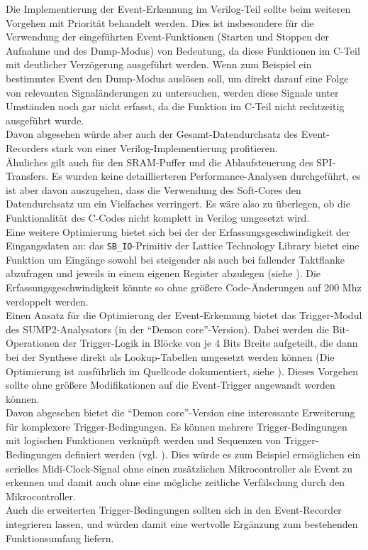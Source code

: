 Die Implementierung der Event-Erkennung im Verilog-Teil sollte beim weiteren Vorgehen mit Priorität behandelt werden. Dies ist insbesondere für die Verwendung der eingeführten Event-Funktionen (Starten und Stoppen der Aufnahme und des Dump-Modus) von Bedeutung, da diese Funktionen im C-Teil mit deutlicher Verzögerung ausgeführt werden. Wenn zum Beispiel ein bestimmtes Event den Dump-Modus auslösen soll, um direkt darauf eine Folge von relevanten Signaländerungen zu untersuchen, werden diese Signale unter Umständen noch gar nicht erfasst, da die Funktion im C-Teil nicht rechtzeitig ausgeführt wurde.\\
Davon abgesehen würde aber auch der Gesamt-Datendurchsatz des Event-Recorders stark von einer Verilog-Implementierung profitieren.\\
Ähnliches gilt auch für den SRAM-Puffer und die Ablaufsteuerung des SPI-Transfers. Es wurden keine detaillierteren Performance-Analysen durchgeführt, es ist aber davon auszugehen, dass die Verwendung des Soft-Cores den Datendurchsatz um ein Vielfaches verringert. Es wäre also zu überlegen, ob die Funktionalität des C-Codes nicht komplett in Verilog umgesetzt wird.\\
Eine weitere Optimierung bietet sich bei der der Erfassungsgeschwindigkeit der Eingangsdaten an:
das {\tt SB\_IO}-Primitiv der Lattice Technology Library bietet eine Funktion um Eingänge sowohl bei steigender als auch bei fallender Taktflanke abzufragen und jeweils in einem eigenen Register abzulegen (siehe \cite{doc:tec_lib}). Die Erfassungsgeschwindigkeit könnte so ohne größere Code-Änderungen auf 200 Mhz verdoppelt werden.\\  
Einen Ansatz für die Optimierung der Event-Erkennung bietet das Trigger-Modul des SUMP2-Analysators (in der ``Demon core''-Version). Dabei werden die Bit-Operationen der Trigger-Logik in Blöcke von je 4 Bits Breite aufgeteilt, die dann bei der Synthese direkt als Lookup-Tabellen umgesetzt werden können (Die Optimierung ist ausführlich im Quellcode dokumentiert, siehe \cite{web:sump2_trigger}). Dieses Vorgehen sollte ohne größere Modifikationen auf die Event-Trigger angewandt werden können. \\
Davon abgesehen bietet die ``Demon core''-Version eine interessante Erweiterung für komplexere Trigger-Bedingungen. Es können mehrere Trigger-Bedingungen mit logischen Funktionen verknüpft werden und Sequenzen von Trigger-Bedingungen definiert werden (vgl. \cite{web:demon_doc}). Dies würde es zum Beispiel ermöglichen ein serielles Midi-Clock-Signal ohne einen zusätzlichen Mikrocontroller als Event zu erkennen und damit auch ohne eine mögliche zeitliche Verfälschung durch den Mikrocontroller.\\
Auch die erweiterten Trigger-Bedingungen sollten sich in den Event-Recorder integrieren lassen, und würden damit eine wertvolle Ergänzung zum bestehenden Funktionsumfang liefern. 



